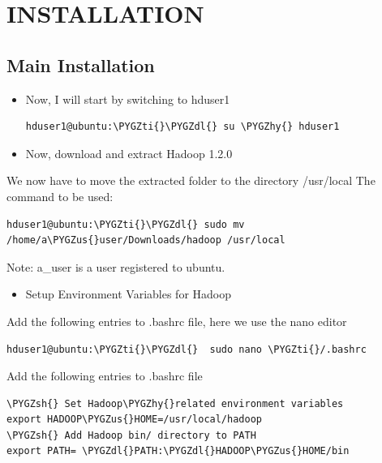 \documentclass[a4paper,12pt,oneside]{sphinxmanual}
\def\PYGZus{\char`\_}
\def\PYGZsh{\char`\#}
\def\PYGZdl{\char`\$}
\def\PYGZhy{\char`\-}
\def\PYGZti{\char`\~}
\begin{document}
\section{INSTALLATION}
\label{document:installation}

\subsection{Main Installation}
\label{document:main-installation}\begin{itemize}
\item {} 
Now, I will start by switching to hduser1

\begin{Verbatim}[commandchars=\\\{\}]
hduser1@ubuntu:\PYGZti{}\PYGZdl{} su \PYGZhy{} hduser1
\end{Verbatim}

\item {} 
Now, download and extract Hadoop 1.2.0

\end{itemize}

We now have to move the extracted folder to the directory /usr/local
The command to be used:

\begin{Verbatim}[commandchars=\\\{\}]
hduser1@ubuntu:\PYGZti{}\PYGZdl{} sudo mv /home/a\PYGZus{}user/Downloads/hadoop /usr/local
\end{Verbatim}

Note: a\_user is a user registered to ubuntu.
\begin{itemize}
\item {} 
Setup Environment Variables for Hadoop

\end{itemize}

Add the following entries to .bashrc file, here we use the nano editor

\begin{Verbatim}[commandchars=\\\{\}]
hduser1@ubuntu:\PYGZti{}\PYGZdl{}  sudo nano \PYGZti{}/.bashrc
\end{Verbatim}

Add the following entries to .bashrc file

\begin{Verbatim}[commandchars=\\\{\}]
\PYGZsh{} Set Hadoop\PYGZhy{}related environment variables
export HADOOP\PYGZus{}HOME=/usr/local/hadoop
\PYGZsh{} Add Hadoop bin/ directory to PATH
export PATH= \PYGZdl{}PATH:\PYGZdl{}HADOOP\PYGZus{}HOME/bin
\end{Verbatim}
\end{document}
